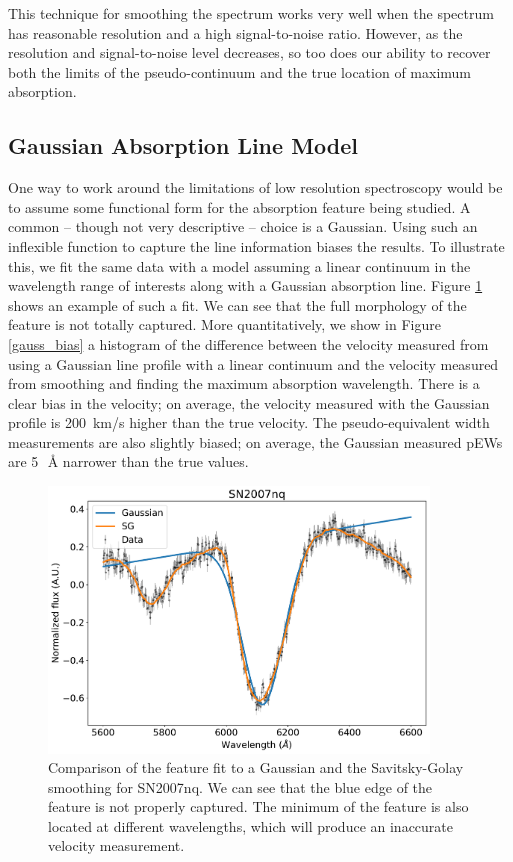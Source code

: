 This technique for smoothing the spectrum works very well when the spectrum has reasonable resolution and a high signal-to-noise ratio. However, as the resolution and signal-to-noise level decreases, so too does our ability to recover both the limits of the pseudo-continuum and the true location of maximum absorption. 

\subsection{Gaussian Absorption Line Model}
One way to work around the limitations of low resolution spectroscopy would be to assume some functional form for the absorption feature being studied. A common -- though not very descriptive -- choice is a Gaussian. Using such an inflexible function to capture the line information biases the results. To illustrate this, we fit the same data with a model assuming a linear continuum in the wavelength range of interests along with a Gaussian absorption line. Figure \ref{gauss_feat_fit} shows an example of such a fit. We can see that the full morphology of the feature is not totally captured. More quantitatively, we show in Figure \ref{gauss_bias} a histogram of the difference between the velocity measured from using a Gaussian line profile with a linear continuum and the velocity measured from smoothing and finding the maximum absorption wavelength. There is a clear bias in the velocity; on average, the velocity measured with the Gaussian profile is 200~km/s higher than the true velocity. The pseudo-equivalent width measurements are also slightly biased; on average, the Gaussian measured pEWs are 5~\,\AA{} narrower than the true values.

\begin{figure}
    \centering
    \includegraphics[width=0.9\textwidth]{figures/si_feat_pca/gauss_fit_example.pdf}
    \caption{Comparison of the \siliconii{} feature fit to a Gaussian and the Savitsky-Golay smoothing for SN2007nq. We can see that the blue edge of the feature is not properly captured. The minimum of the feature is also located at different wavelengths, which will produce an inaccurate velocity measurement.}
    \label{gauss_feat_fit}
\end{figure}

